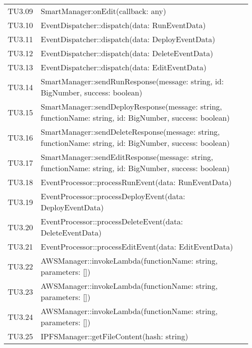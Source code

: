 \begin{longtable}{
		>{\centering}p{}
		>{}p{}}
	TU3.09 & SmartManager:onEdit(callback: any) \\
	
	TU3.10 & EventDispatcher::dispatch(data: RunEventData) \\
	
	TU3.11 & EventDispatcher::dispatch(data: DeployEventData) \\
	
	TU3.12 & EventDispatcher::dispatch(data: DeleteEventData) \\
	
	TU3.13 & EventDispatcher::dispatch(data: EditEventData) \\
	
	TU3.14 & SmartManager::sendRunResponse(message: string, id: BigNumber, success: boolean) \\
	
	TU3.15 & SmartManager::sendDeployResponse(message: string, functionName: string, id: BigNumber, success: boolean) \\
	
	TU3.16 & SmartManager::sendDeleteResponse(message: string, functionName: string, id: BigNumber, success: boolean) \\
	
	TU3.17 & SmartManager::sendEditResponse(message: string, functionName: string, id: BigNumber, success: boolean) \\
	
	TU3.18 & EventProcessor::processRunEvent(data: RunEventData) \\
	
	TU3.19 & EventProcessor::processDeployEvent(data: DeployEventData) \\
	
	TU3.20 & EventProcessor::processDeleteEvent(data: DeleteEventData) \\
	
	TU3.21 & EventProcessor::processEditEvent(data: EditEventData) \\
	
	TU3.22 & AWSManager::invokeLambda(functionName: string, parameters: []) \\
	
	TU3.23 & AWSManager::invokeLambda(functionName: string, parameters: []) \\
	
	TU3.24 & AWSManager::invokeLambda(functionName: string, parameters: []) \\
	
	TU3.25 & IPFSManager::getFileContent(hash: string) \\
	

\end{longtable}
